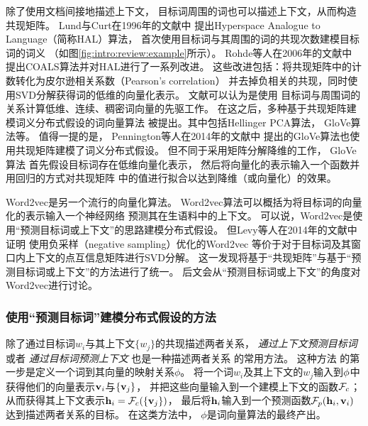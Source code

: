 除了使用文档间接地描述上下文，
目标词周围的词也可以描述上下文，从而构造共现矩阵。
Lund与Curt在1996年的文献中
提出Hyperspace Analogue to Language（简称HAL）算法，
首次使用目标词与其周围的词的共现次数建模目标词的词义
（如图\ref{fig:intro:review:example}所示）。
Rohde等人在2006年的文献中
提出COALS算法并对HAL进行了一系列改进。
这些改进包括：将共现矩阵中的计数转化为皮尔逊相关系数（Pearson's correlation）
并去掉负相关的共现，同时使用SVD分解获得词的低维的向量化表示。
文献可以认为是使用
目标词与周围词的关系计算低维、连续、稠密词向量的先驱工作。
在这之后，多种基于共现矩阵建模词义分布式假设的词向量算法
被提出。其中包括Hellinger PCA算法，
GloVe算法等。
值得一提的是，
Pennington等人在2014年的文献中
提出的GloVe算法也使用共现矩阵建模了词义分布式假设。
但不同于采用矩阵分解降维的工作，
GloVe算法
首先假设目标词存在低维向量化表示，
然后将向量化的表示输入一个函数并用回归的方式对共现矩阵
中的值进行拟合以达到降维（或向量化）的效果。

Word2vec\cite{NIPS2013_5021}是另一个流行的向量化算法。
Word2vec算法可以概括为将目标词的向量化的表示输入一个神经网络
预测其在生语料中的上下文。
可以说，Word2vec是使用``预测目标词或上下文''的思路建模分布式假设。
但Levy等人在2014年的文献中证明
使用负采样（negative sampling）优化的Word2vec
等价于对于目标词及其窗口内上下文的点互信息矩阵进行SVD分解。
这一发现将基于``共现矩阵''与基于``预测目标词或上下文''的方法进行了统一。
后文会从``预测目标词或上下文''的角度对Word2vec进行讨论。

\subsubsection{使用``预测目标词''建模分布式假设的方法}\label{sec:intro:review:static-emb:predict}
除了通过目标词$w_i$与其上下文$\{w_j\}$的共现描述两者关系，
\textit{通过上下文预测目标词}或者
\textit{通过目标词预测上下文}
也是一种描述两者关系
的常用方法。
这种方法
的第一步是定义一个词到其向量的映射关系$\phi$。
将一个词$w_i$及其上下文的$w_j$输入到$\phi$中
获得他们的向量表示$\mathbf{v}_i$与$\{\mathbf{v}_j\}$，
并把这些向量输入到一个建模上下文的函数$\mathcal{F}_{c}$；
从而获得其上下文表示$\mathbf{h}_i=\mathcal{F}_{c} (\{\mathbf{v}_j\})$，
最后将$\mathbf{h}_i$输入到一个预测函数$\mathcal{F}_{p} (\mathbf{h}_i, \mathbf{v}_i)$
达到描述两者关系的目标。
在这类方法中，
$\phi$是词向量算法的最终产出。

